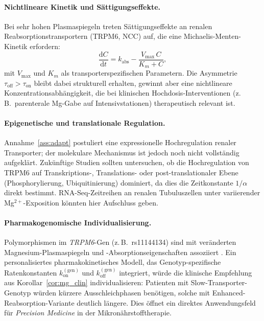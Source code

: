 ﻿\documentclass[12pt,a4paper]{article}
\theoremstyle{plain}
\theoremstyle{definition}
\theoremstyle{remark}
\begin{document}
\paragraph{Nichtlineare Kinetik und Sättigungseffekte.}
Bei sehr hohen Plasmaspiegeln treten Sättigungseffekte an renalen
Reabsorptionstransportern (TRPM6, NCC) auf, die eine Michaelis-Menten-Kinetik
erfordern:
\begin{equation}
  \frac{\mathrm{d}C}{\mathrm{d}t} = k_\text{abs} - \frac{V_{\max} \, C}{K_m + C},
\end{equation}
mit $V_{\max}$ und $K_m$ als transporterspezifischen Parametern. Die
Asymmetrie $\tau_\text{off} > \tau_\text{on}$ bleibt dabei strukturell
erhalten, gewinnt aber eine nichtlineare Konzentrationsabhängigkeit, die
bei klinischen Hochdosis-Interventionen (z.\,B.\ parenterale Mg-Gabe auf
Intensivstationen) therapeutisch relevant ist.

\paragraph{Epigenetische und translationale Regulation.}
Annahme~\ref{ass:adapt} postuliert eine expressionelle Hochregulation renaler
Transporter; der molekulare Mechanismus ist jedoch noch nicht vollständig
aufgeklärt. Zukünftige Studien sollten untersuchen, ob die Hochregulation
von TRPM6 auf Transkriptions-, Translations- oder post-translationaler Ebene
(Phosphorylierung, Ubiquitinierung) dominiert, da dies die Zeitkonstante
$1/\alpha$ direkt bestimmt. RNA-Seq-Zeitreihen an renalen Tubuluszellen unter
variierender Mg$^{2+}$-Exposition könnten hier Aufschluss geben.

\paragraph{Pharmakogenomische Individualisierung.}
Polymorphismen im \textit{TRPM6}-Gen (z.\,B.\ rs11144134) sind mit
veränderten Magnesium-Plasmaspiegeln und -Absorptionseigenschaften assoziiert
\cite{DiNicolantonio2018}. Ein personalisiertes pharmakokinetisches Modell,
das Genotyp-spezifische Ratenkonstanten $k_\text{on}^{(\text{gen})}$ und
$k_\text{off}^{(\text{gen})}$ integriert, würde die klinische Empfehlung
aus Korollar~\ref{cor:mg_clin} individualisieren: Patienten mit
Slow-Transporter-Genotyp würden kürzere Ausschleichphasen benötigen,
solche mit Enhanced-Reabsorption-Variante deutlich längere. Dies öffnet ein
direktes Anwendungsfeld für \emph{Precision Medicine} in der
Mikronährstofftherapie.
\end{document}

